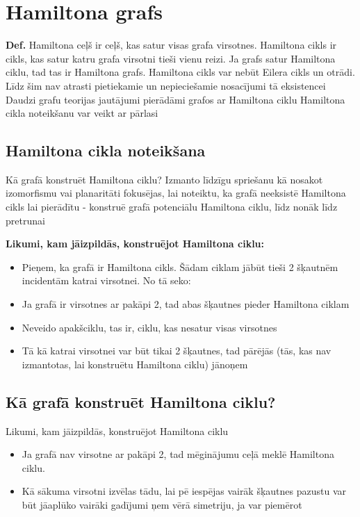 \documentclass{article}
\begin{document}
\section{Hamiltona grafs}

\textbf{Def.}  Hamiltona ceļš ir ceļš, kas satur visas grafa virsotnes.  Hamiltona cikls ir cikls, kas satur katru grafa virsotni tieši vienu reizi.  Ja grafs satur Hamiltona ciklu, tad tas ir Hamiltona grafs.  Hamiltona cikls var nebūt Eilera cikls un otrādi.  Līdz šim nav atrasti pietiekamie un nepieciešamie nosacījumi tā eksistencei Daudzi grafu teorijas jautājumi pierādāmi grafos ar Hamiltona ciklu Hamiltona cikla noteikšanu var veikt ar pārlasi

\subsection{Hamiltona cikla noteikšana}
Kā grafā konstruēt Hamiltona ciklu? Izmanto līdzīgu spriešanu kā nosakot izomorfismu vai planaritāti fokusējas, lai noteiktu, ka grafā neeksistē Hamiltona cikls lai pierādītu - konstruē grafā potenciālu Hamiltona ciklu, līdz nonāk līdz pretrunai

\textbf{Likumi, kam jāizpildās, konstruējot Hamiltona ciklu:}
\begin{itemize}
	\item Pieņem, ka grafā ir Hamiltona cikls. Šādam ciklam jābūt tieši 2 šķautnēm incidentām katrai virsotnei. No tā seko:
	\item Ja grafā ir virsotnes ar pakāpi 2, tad abas šķautnes pieder Hamiltona ciklam
	\item Neveido apakšciklu, tas ir, ciklu, kas nesatur visas virsotnes
	\item Tā kā katrai virsotnei var būt tikai 2 šķautnes, tad pārējās (tās, kas nav izmantotas, lai konstruētu Hamiltona ciklu) jānoņem
\end{itemize}
	
\subsection{Kā grafā konstruēt Hamiltona ciklu?}
Likumi, kam jāizpildās, konstruējot Hamiltona ciklu
\begin{itemize}
	\item Ja grafā nav virsotne ar pakāpi 2, tad mēginājumu ceļā meklē Hamiltona ciklu.
	\item Kā sākuma virsotni izvēlas tādu, lai pē iespējas vairāk šķautnes pazustu var būt jāaplūko vairāki gadījumi ņem vērā simetriju, ja var piemērot
\end{itemize}
	
\end{document}
